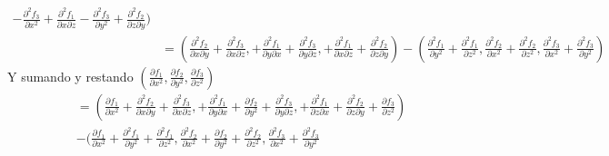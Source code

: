 \documentclass{article}
\begin{document}
\begin{enumerate}
{\begin{enumerate}
{\begin{align*}
                    -\frac{\partial^2f_3}{\partial x^2}
                    +\frac{\partial^2f_1}{\partial x \partial z}
                    -\frac{\partial^2f_3}{\partial y^2}
                    +\frac{\partial^2f_2}{\partial z \partial y}
                    )\\
                    &=
                    (
                    \frac{\partial^2f_2}{\partial x \partial y}
                    +\frac{\partial^2f_3}{\partial x \partial z},
                    +\frac{\partial^2f_1}{\partial y \partial x}
                    +\frac{\partial^2f_3}{\partial y \partial z},
                    +\frac{\partial^2f_1}{\partial x \partial z}
                    +\frac{\partial^2f_2}{\partial z \partial y}
                    )
                    -
                    (
                    \frac{\partial^2f_1}{\partial y^2}
                    +\frac{\partial^2f_1}{\partial z^2},
                    \frac{\partial^2f_2}{\partial x^2}
                    +\frac{\partial^2f_2}{\partial z^2},
                    \frac{\partial^2f_3}{\partial x^2}
                    +\frac{\partial^2f_3}{\partial y^2}
                    )
                \end{align*}
                Y sumando y restando $(\frac{\partial f_1}{\partial x^2},
                \frac{\partial f_2}{\partial y^2},
                \frac{\partial f_3}{\partial z^2})$
                \begin{align*}
                    &=(
                    \frac{\partial f_1}{\partial x^2}
                    +\frac{\partial^2f_2}{\partial x \partial y}
                    +\frac{\partial^2f_3}{\partial x \partial z},
                    +\frac{\partial^2f_1}{\partial y \partial x}
                    +\frac{\partial f_2}{\partial y^2}
                    +\frac{\partial^2f_3}{\partial y \partial z},
                    +\frac{\partial^2f_1}{\partial z \partial x}
                    +\frac{\partial^2f_2}{\partial z \partial y}
                    +\frac{\partial f_3}{\partial z^2}
                    )\\
                    &-
                    (
                    \frac{\partial f_1}{\partial x^2}
                    +\frac{\partial^2f_1}{\partial y^2}
                    +\frac{\partial^2f_1}{\partial z^2},
                    \frac{\partial^2f_2}{\partial x^2}
                    +\frac{\partial f_2}{\partial y^2}
                    +\frac{\partial^2f_2}{\partial z^2},
                    \frac{\partial^2f_3}{\partial x^2}
                    +\frac{\partial^2f_3}{\partial y^2}

\end{align*}}
\end{enumerate}}
\end{enumerate}
\end{document}
